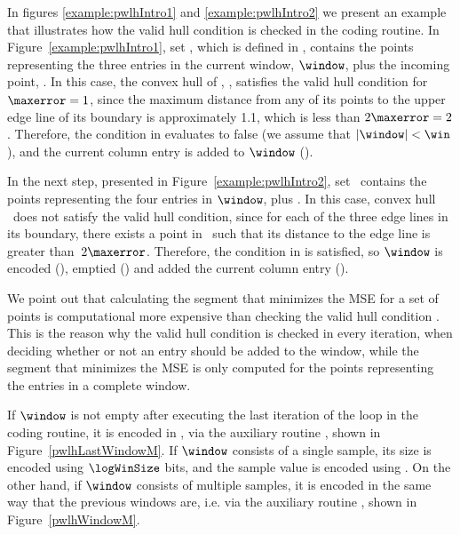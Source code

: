 In figures \ref{example:pwlhIntro1} and \ref{example:pwlhIntro2} we present an example that illustrates how the valid hull condition is checked in the coding routine. In Figure~\ref{example:pwlhIntro1}, set \PWLHSet, which is defined in , contains the points representing the three entries in the current window, $\window$, plus the incoming point, . In this case, the convex hull of \PWLHSet, \hull, satisfies the valid hull condition for $\maxerror = 1$, since the maximum distance from any of its points to the upper edge line of its boundary is approximately 1.1, which is less than $2\maxerror = 2$. Therefore, the condition in  evaluates to false (we assume that $|\window|<\win$), and the current column entry is added to $\window$ ().


In the next step, presented in Figure~\ref{example:pwlhIntro2}, set \PWLHSet\ contains the points representing the four entries in $\window$, plus . In this case, convex hull \hull\ does not satisfy the valid hull condition, since for each of the three edge lines in its boundary, there exists a point in \hull\ such that its distance to the edge line is greater than~$2\maxerror$. Therefore, the condition in  is satisfied, so $\window$ is encoded (), emptied () and added the current column entry ().


\vspace{+5pt}
\examplePWLH


We point out that calculating the segment that minimizes the MSE for a set of points is computational more expensive than checking the valid hull condition \cite{AnEva2013}. This is the reason why the valid hull condition is checked in every iteration, when deciding whether or not an entry should be added to the window, while the segment that minimizes the MSE is only computed for the points representing the entries in a complete window.


If $\window$ is not empty after executing the last iteration of the loop in the coding routine, it is encoded in , via the auxiliary routine \EncodeLastWindowPWLH, shown in Figure~\ref{pwlhLastWindowM}. If $\window$ consists of a single sample, its size is encoded using $\logWinSize$ bits, and the sample value is encoded using \tobitexp. On the other hand, if $\window$ consists of multiple samples, it is encoded in the same way that the previous windows are, i.e. via the auxiliary routine \EncodeWindow, shown in Figure~\ref{pwlhWindowM}.


